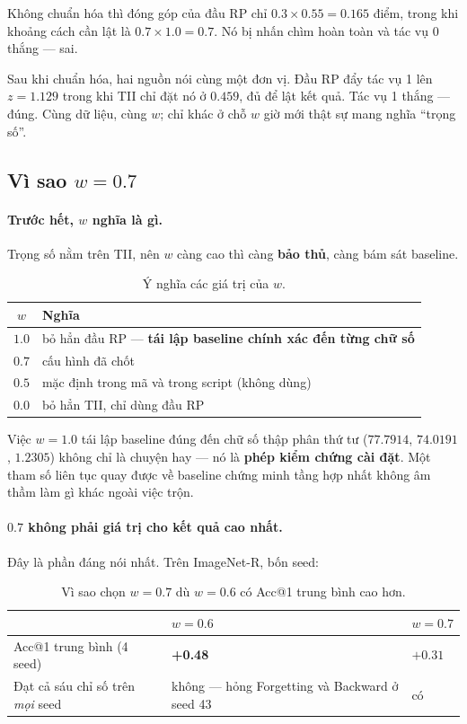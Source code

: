\documentclass[11pt,a4paper]{article}
\begin{document}
Không chuẩn hóa thì đóng góp của đầu RP chỉ $0.3 \times 0.55 = 0.165$ điểm, trong
khi khoảng cách cần lật là $0.7 \times 1.0 = 0.7$. Nó bị nhấn chìm hoàn toàn và
tác vụ 0 thắng --- sai.

Sau khi chuẩn hóa, hai nguồn nói cùng một đơn vị. Đầu RP đẩy tác vụ 1 lên
$z = 1.129$ trong khi TII chỉ đặt nó ở $0.459$, đủ để lật kết quả. Tác vụ 1
thắng --- đúng. Cùng dữ liệu, cùng $w$; chỉ khác ở chỗ $w$ giờ mới thật sự mang
nghĩa ``trọng số''.

\subsection{Vì sao $w = 0.7$}
\label{sec:tang1-w}

\paragraph{Trước hết, $w$ nghĩa là gì.}
Trọng số nằm trên TII, nên $w$ càng cao thì càng \textbf{bảo thủ}, càng bám sát
baseline.

\begin{table}[htbp]
\centering
\caption{Ý nghĩa các giá trị của $w$.}
\label{tab:y-nghia-w}
\begin{tabular}{@{}cl@{}}
\toprule
$w$ & Nghĩa \\
\midrule
$1.0$ & bỏ hẳn đầu RP --- \textbf{tái lập baseline chính xác đến từng chữ số} \\
$0.7$ & cấu hình đã chốt \\
$0.5$ & mặc định trong mã và trong script (không dùng) \\
$0.0$ & bỏ hẳn TII, chỉ dùng đầu RP \\
\bottomrule
\end{tabular}
\end{table}

Việc $w = 1.0$ tái lập baseline đúng đến chữ số thập phân thứ tư ($77.7914$,
$74.0191$, $1.2305$) không chỉ là chuyện hay --- nó là \textbf{phép kiểm chứng
cài đặt}. Một tham số liên tục quay được về baseline chứng minh tầng hợp nhất
không âm thầm làm gì khác ngoài việc trộn.

\paragraph{$0.7$ không phải giá trị cho kết quả cao nhất.}
Đây là phần đáng nói nhất. Trên ImageNet-R, bốn seed:

\begin{table}[htbp]
\centering
\caption{Vì sao chọn $w = 0.7$ dù $w = 0.6$ có Acc@1 trung bình cao hơn.}
\label{tab:chon-w}
\begin{tabular}{@{}p{5.8cm}p{4.6cm}p{2.6cm}@{}}
\toprule
 & $w = 0.6$ & $w = 0.7$ \\
\midrule
Acc@1 trung bình (4 seed) & \textbf{+0.48} & $+0.31$ \\
Đạt cả sáu chỉ số trên \emph{mọi} seed
  & không --- hỏng Forgetting và Backward ở seed 43 & có \\
\bottomrule
\end{tabular}
\end{table}
\end{document}
